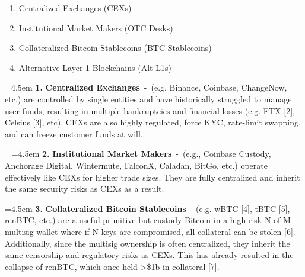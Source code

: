 \documentclass[
]{article}
\providecommand{\tightlist}{%
  \setlength{\itemsep}{0pt}\setlength{\parskip}{0pt}}
\begin{document}
\vspace*{\baselineskip}


\hspace{3em}{Users who want to swap between Bitcoin and Ethereum today have 4
options:}

{}

{
\addtolength{\leftmargini}{1cm} %
\begin{enumerate}
\tightlist
\item
  {Centralized Exchanges (CEXs)}
\item
  {Institutional Market Makers (OTC Desks)}
\item
  {Collateralized Bitcoin Stablecoins (BTC Stablecoins)}
\item
  {Alternative Layer-1 Blockchains (Alt-L1s)}
\end{enumerate}
}


\vspace*{\baselineskip}


\hspace{3em}{All of these suffer from the same core problems: they are far less
secure than the base chains users hold assets on, and come with other
inherent risks:}
\vspace*{\baselineskip}

\noindent
\hangindent=4.5em
\hspace{3em}\textbf{1.} \textbf{Centralized Exchanges}{~}{-}{~}{(e.g. Binance, Coinbase,
ChangeNow, etc.) are controlled by single entities and have historically
struggled to manage user funds, resulting in multiple bankruptcies and
financial losses (e.g. FTX {[}2{]}, Celsius {[}3{]}, etc). CEXs are also
highly regulated, force KYC, rate-limit swapping, and can freeze
customer funds at will.}

\
\noindent
\hangindent=4.5em
\hspace{3em}\textbf{2.} \textbf{Institutional Market Makers}{~}{-}{~}{(e.g., Coinbase Custody,
Anchorage Digital, Wintermute, FalconX, Caladan, BitGo, etc.) operate
effectively like CEXs for higher trade sizes. They are fully centralized
and inherit the same security risks as CEXs as a result.}

{}
\noindent
\hangindent=4.5em
\hspace{3em}\textbf{3.} \textbf{Collateralized Bitcoin Stablecoins}{~- (e.g. wBTC {[}4{]}, tBTC
{[}5{]}, renBTC, etc.) are a useful primitive but custody Bitcoin in a
high-risk N-of-M multisig wallet where if N keys are compromised, all
collateral can be stolen {[}6{]}. Additionally, since the multisig
ownership is often centralized, they inherit the same censorship and
regulatory risks as CEXs. This has already resulted in the collapse of
renBTC, which once held \textgreater\$1b in collateral {[}7{]}.}
\end{document}
